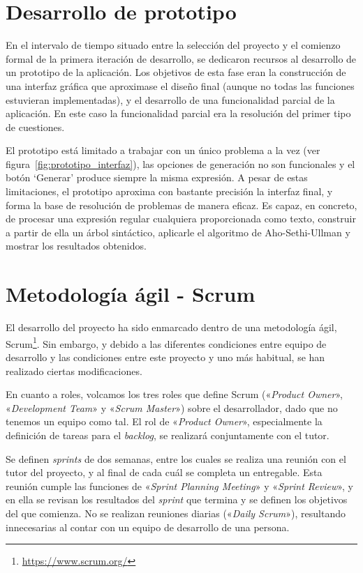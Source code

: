 
\section{Desarrollo de prototipo}
En el intervalo de tiempo situado entre la selección del proyecto y el comienzo formal de la primera iteración de desarrollo, se dedicaron recursos al desarrollo de un prototipo de la aplicación.
Los objetivos de esta fase eran la construcción de una interfaz gráfica que aproximase el diseño final (aunque no todas las funciones estuvieran implementadas), y el desarrollo de una funcionalidad parcial de la aplicación.
En este caso la funcionalidad parcial era la resolución del primer tipo de cuestiones.


El prototipo está limitado a trabajar con un único problema a la vez (ver figura~\ref{fig:prototipo_interfaz}), las opciones de generación no son funcionales y el botón `Generar' produce siempre la misma expresión.
A pesar de estas limitaciones, el prototipo aproxima con bastante precisión la interfaz final, y forma la base de resolución de problemas de manera eficaz.
Es capaz, en concreto, de procesar una expresión regular cualquiera proporcionada como texto, construir a partir de ella un árbol sintáctico, aplicarle el algoritmo de Aho-Sethi-Ullman y mostrar los resultados obtenidos.

\section{Metodología ágil - Scrum}
El desarrollo del proyecto ha sido enmarcado dentro de una metodología ágil, Scrum\footnote{\url{https://www.scrum.org/}}.
Sin embargo, y debido a las diferentes condiciones entre equipo de desarrollo y las condiciones entre este proyecto y uno más habitual, se han realizado ciertas modificaciones.

En cuanto a roles, volcamos los tres roles que define Scrum («\emph{Product Owner}», «\emph{Development Team}» y «\emph{Scrum Master}») sobre el desarrollador, dado que no tenemos un equipo como tal.
El rol de «\emph{Product Owner}», especialmente la definición de tareas para el \emph{backlog}, se realizará conjuntamente con el tutor.

Se definen \emph{sprints} de dos semanas, entre los cuales se realiza una reunión con el tutor del proyecto, y al final de cada cuál se completa un entregable.
Esta reunión cumple las funciones de «\emph{Sprint Planning Meeting}» y «\emph{Sprint Review}», y en ella se revisan los resultados del \emph{sprint} que termina y se definen los objetivos del que comienza.
No se realizan reuniones diarias («\emph{Daily Scrum}»), resultando innecesarias al contar con un equipo de desarrollo de una persona.

